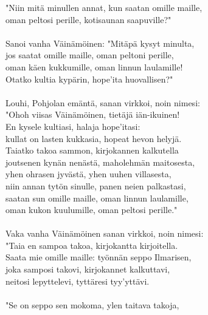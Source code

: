 "Niin mitä minullen annat, kun saatan omille maille,      \\
oman peltosi perille, kotisaunan saapuville?"             \\
                                                          \\
Sanoi vanha Väinämöinen: "Mitäpä kysyt minulta,           \\
jos saatat omille maille, oman peltoni perille,           \\
oman käen kukkumille, oman linnun laulamille!             \\
Otatko kultia kypärin, hope'ita huovallisen?"             \\
                                                          \\
Louhi, Pohjolan emäntä, sanan virkkoi, noin nimesi:       \\
"Ohoh viisas Väinämöinen, tietäjä iän-ikuinen!            \\
En kysele kultiasi, halaja hope'itasi:                    \\
kullat on lasten kukkasia, hopeat hevon helyjä.           \\
Taiatko takoa sammon, kirjokannen kalkutella              \\
joutsenen kynän nenästä, maholehmän maitosesta,           \\
yhen ohrasen jyvästä, yhen uuhen villasesta,              \\
niin annan tytön sinulle, panen neien palkastasi,         \\
saatan sun omille maille, oman linnun laulamille,         \\
oman kukon kuulumille, oman peltosi perille."             \\
                                                          \\
Vaka vanha Väinämöinen sanan virkkoi, noin nimesi:        \\
"Taia en sampoa takoa, kirjokantta kirjoitella.           \\
Saata mie omille maille: työnnän seppo Ilmarisen,         \\
joka samposi takovi, kirjokannet kalkuttavi,              \\
neitosi lepyttelevi, tyttäresi tyy'yttävi.                \\
                                                          \\
"Se on seppo sen mokoma, ylen taitava takoja,             \\
